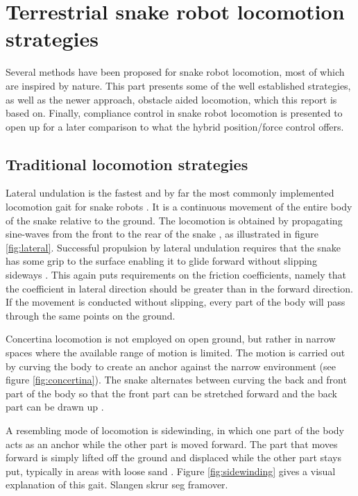 \section{Terrestrial snake robot locomotion strategies}



Several methods have been proposed for snake robot locomotion, most of which are inspired by nature. This part presents some of the well established strategies, as well as the newer approach, obstacle aided locomotion, which this report is based on. Finally, compliance control in snake robot locomotion is presented to open up for a later comparison to what the hybrid position/force control offers.

\subsection{Traditional locomotion strategies}

Lateral undulation is the fastest and by far the most commonly implemented locomotion gait for snake robots \cite{sanfilippo2017perception}.
It is a continuous movement of the entire body of the snake relative to the ground. The locomotion is obtained by propagating sine-waves from the front to the rear of the snake \cite{transeth2006developments}, as illustrated in figure \ref{fig:lateral}.
Successful propulsion by lateral undulation requires that the snake has some grip to the surface enabling it to glide forward without slipping sideways \cite{liljeback2012review}. This again puts requirements on the friction coefficients, namely that the coefficient in lateral direction should be greater than in the forward
direction. If the movement is conducted without slipping, every part of the body will pass through the same points on the ground.

Concertina locomotion is not employed on open ground, but rather in narrow spaces where the available range of motion is limited. The motion is carried out by curving the body
to create an anchor against the narrow environment (see figure \ref{fig:concertina}). The snake alternates between curving the back and front part of the body so that the front part can be stretched forward and the back part can be drawn up \cite{liljeback2012snake}.

A resembling mode of locomotion is sidewinding, in which one part of the body acts as an anchor while the other part is moved forward. The part that moves forward is simply lifted off the ground and displaced while the other part stays put, typically in areas with loose sand \cite{liljeback2012snake}. Figure \ref{fig:sidewinding} gives a visual explanation of this gait. Slangen skrur seg framover.

